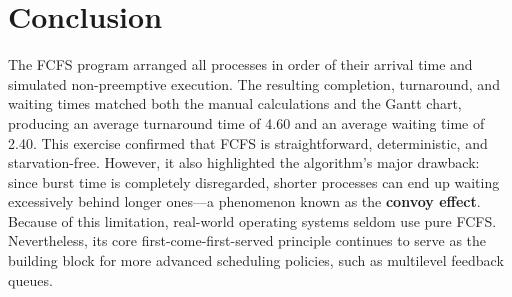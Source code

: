 \documentclass[12pt,a4paper]{article}
\begin{document}
\section{Conclusion}

The FCFS program arranged all processes in order of their arrival time and
simulated non-preemptive execution. The resulting completion, turnaround, and
waiting times matched both the manual calculations and the Gantt chart,
producing an average turnaround time of 4.60 and an average waiting time of
2.40. This exercise confirmed that FCFS is straightforward, deterministic, and
starvation-free. However, it also highlighted the algorithm's major drawback:
since burst time is completely disregarded, shorter processes can end up
waiting excessively behind longer ones---a phenomenon known as the
\textbf{convoy effect}. Because of this limitation, real-world operating
systems seldom use pure FCFS. Nevertheless, its core first-come-first-served
principle continues to serve as the building block for more advanced
scheduling policies, such as multilevel feedback queues.
\end{document}
